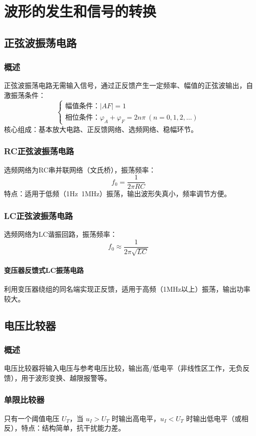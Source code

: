\chapter{波形的发生和信号的转换}

\section{正弦波振荡电路}
\subsection{概述}
正弦波振荡电路无需输入信号，通过正反馈产生一定频率、幅值的正弦波输出，自激振荡条件：
\[
\begin{cases}
\text{幅值条件：} |AF| = 1 \\
\text{相位条件：} \varphi_A + \varphi_F = 2n\pi \ (n=0,1,2,\dots)
\end{cases}
\]
核心组成：基本放大电路、正反馈网络、选频网络、稳幅环节。

\subsection{RC正弦波振荡电路}
选频网络为RC串并联网络（文氏桥），振荡频率：
\[ f_0 = \frac{1}{2\pi RC} \]
特点：适用于低频（1Hz~1MHz）振荡，输出波形失真小，频率调节方便。

\subsection{LC正弦波振荡电路}
选频网络为LC谐振回路，振荡频率：
\[ f_0 \approx \frac{1}{2\pi\sqrt{LC}} \]
\subsubsection{变压器反馈式LC振荡电路}
利用变压器绕组的同名端实现正反馈，适用于高频（1MHz以上）振荡，输出功率较大。

\section{电压比较器}
\subsection{概述}
电压比较器将输入电压与参考电压比较，输出高/低电平（非线性区工作，无负反馈），用于波形变换、越限报警等。

\subsection{单限比较器}
只有一个阈值电压 $U_T$，当 $u_I > U_T$ 时输出高电平，$u_I < U_T$ 时输出低电平（或相反），特点：结构简单，抗干扰能力差。


